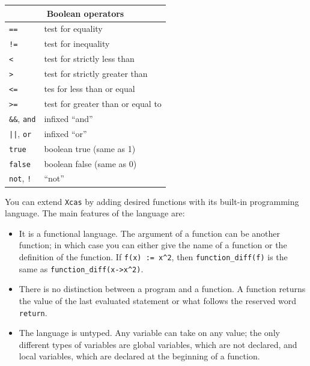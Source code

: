 \documentclass{article}
\begin{document}
\begin{center}
\begin{tabular}{|p{}|p{}|}
\hline
\multicolumn{2}{|c|}{\bf Boolean operators}\\
\hline\hline
\texttt{==}   & test for equality\\
\texttt{!=} & test for inequality\\
\texttt{<}    & test for strictly less than\\
\texttt{>}  & test for strictly greater than\\
\texttt{<=}   & tes  for less than or equal\\
\texttt{>=} & test for greater than or equal to\\
\texttt{\&\&}, \texttt{and} & infixed ``and''\\
\texttt{||}, \texttt{or}& infixed ``or''\\
\texttt{true}    & boolean true (same as 1)\\
\texttt{false}  & boolean false (same as 0)\\
\texttt{not}, \texttt{!} & ``not''\\
\hline
\end{tabular}
\end{center}

You can extend \texttt{Xcas} by adding desired functions with its
built-in programming language.  The  main features of the language are:

\begin{itemize}
  \item 
  It is a functional language.  The argument of a function can
  be another function; in which case you can either give the name of
  a function or the definition of the function.  If 
  \texttt{f(x) := x\^{}2}, then
  \texttt{function\_diff(f)} is the same as
  \texttt{function\_diff(x->x\^{}2)}.
  
  \item
  There is no distinction between a program and a function.  A
  function returns the value of the last evaluated statement or what
  follows the reserved word \texttt{return}.

  \item
  The language is untyped.  Any variable can take on any value; the
  only different types of variables are global variables, which are
  not declared, and local variables, which are declared at the
  beginning of a function.
\end{itemize}
\end{document}
